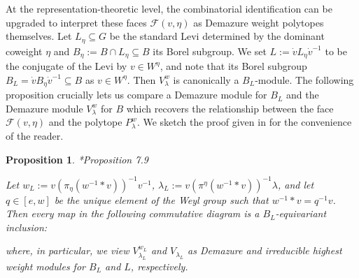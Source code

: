 \documentclass[12pt,reqno]{amsart}
\newtheorem{proposition}[theorem]{Proposition}
\theoremstyle{definition}
\begin{document}
%
%

At the representation-theoretic level, the combinatorial identification can be upgraded to interpret these faces $\mathcal{F}(v,\eta)$ as Demazure weight polytopes themselves. Let $L_\eta \subseteq G$ be the standard Levi determined by the dominant coweight $\eta$ and $B_\eta:=B \cap L_\eta \subseteq B$ its Borel subgroup. We set $L:=\dot{v}L_\eta \dot{v}^{-1}$ to be the conjugate of the Levi by $v \in W^\eta$, and note that its Borel subgroup $B_L = \dot{v} B_\eta \dot{v}^{-1} \subseteq B$ as $v \in W^\eta$. Then $V^w_\lambda$ is canonically a $B_L$-module. The following proposition crucially lets us compare a Demazure module for $B_L$ and the Demazure module $V^w_\lambda$ for $B$ which recovers the relationship between the face $\mathcal{F}(v,\eta)$ and the polytope $P^w_\lambda$. We sketch the proof given in \cite{BJK2} for the convenience of the reader. 





\begin{proposition}{\cite{BJK2}*{Proposition 7.9}} \label{LeviModuleInclusion}

Let $w_L:=v \left(\pi_\eta(w^{-1} \ast v ) \right)^{-1} v^{-1} $, $\lambda_L:= v \left(\pi^\eta (w^{-1} \ast v) \right)^{-1} \lambda $, and let $q \in [e,w]$ be the unique element of the Weyl group such that $w^{-1} \ast v= q^{-1} v$. Then every map in the following commutative diagram is a $B_L$-equivariant inclusion: 
\begin{center}
\end{center}
where, in particular, we view $V^{w_L}_{\lambda_L}$ and $V_{\lambda_L}$ as Demazure and irreducible highest weight modules for $B_L$ and $L$, respectively. 
\end{proposition}
\end{document}

